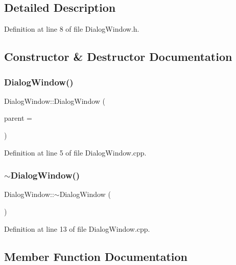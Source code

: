 \subsection{Detailed Description}


Definition at line 8 of file Dialog\+Window.\+h.



\subsection{Constructor \& Destructor Documentation}
\hypertarget{class_dialog_window_a5947ec9e71ed3782211f6d81dd696b21}{}\label{class_dialog_window_a5947ec9e71ed3782211f6d81dd696b21} 
\subsubsection{\texorpdfstring{Dialog\+Window()}{DialogWindow()}}
{\footnotesize\ttfamily Dialog\+Window\+::\+Dialog\+Window (\begin{DoxyParamCaption}\item[{Q\+Widget $\ast$}]{parent = {} }\end{DoxyParamCaption})\hspace{0.3cm}{\ttfamily [explicit]}}



Definition at line 5 of file Dialog\+Window.\+cpp.

\hypertarget{class_dialog_window_a59d3601f7622f31ef928377fc1789eda}{}\label{class_dialog_window_a59d3601f7622f31ef928377fc1789eda} 
\subsubsection{\texorpdfstring{$\sim$\+Dialog\+Window()}{~DialogWindow()}}
{\footnotesize\ttfamily Dialog\+Window\+::$\sim$\+Dialog\+Window (\begin{DoxyParamCaption}{ }\end{DoxyParamCaption})}



Definition at line 13 of file Dialog\+Window.\+cpp.



\subsection{Member Function Documentation}
\hypertarget{class_dialog_window_a4ebb65eafbab8384d0064ad8a0e9c6dd}{}\label{class_dialog_window_a4ebb65eafbab8384d0064ad8a0e9c6dd} 
